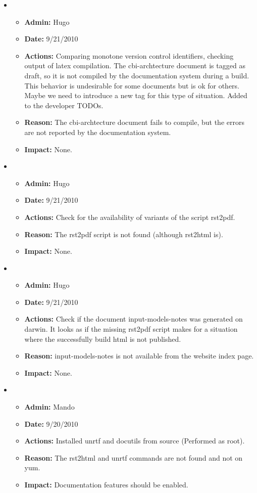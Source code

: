 \documentclass[12pt]{article}
\begin{document}
\begin{itemize}

\item 
\begin{itemize}
\item[] {\bf Admin:} Hugo
\item[] {\bf Date:} 9/21/2010 
\item[] {\bf Actions:} Comparing monotone version control identifiers, checking output of latex compilation.  The cbi-archtecture document is tagged as draft, so it is not compiled by the documentation system during a build.  This behavior is undesirable for some documents but is ok for others.  Maybe we need to introduce a new tag for this type of situation.  Added to the developer TODOs.
\item[] {\bf Reason:} The cbi-archtecture document fails to compile, but the errors are not reported by the documentation system.
\item[] {\bf Impact:} None.
\end{itemize}

\item 
\begin{itemize}
\item[] {\bf Admin:} Hugo
\item[] {\bf Date:} 9/21/2010 
\item[] {\bf Actions:} Check for the availability of variants of the
  script rst2pdf.
\item[] {\bf Reason:} The rst2pdf script is not found (although
  rst2html is).
\item[] {\bf Impact:} None.
\end{itemize}

\item 
\begin{itemize}
\item[] {\bf Admin:} Hugo
\item[] {\bf Date:} 9/21/2010 
\item[] {\bf Actions:} Check if the document input-models-notes was
  generated on darwin.  It looks as if the missing rst2pdf script
  makes for a situation where the successfully build html is not
  published.
\item[] {\bf Reason:} input-models-notes is not available from the
  website index page.
\item[] {\bf Impact:} None.
\end{itemize}

\item 
\begin{itemize}
\item[] {\bf Admin:} Mando
\item[] {\bf Date:} 9/20/2010 
\item[] {\bf Actions:} Installed unrtf and docutils from source (Performed as root).
\item[] {\bf Reason:} The rst2html and unrtf commands are not found and not on yum.
\item[] {\bf Impact:} Documentation features should be enabled.
\end{itemize}


\end{itemize}
\end{document}
